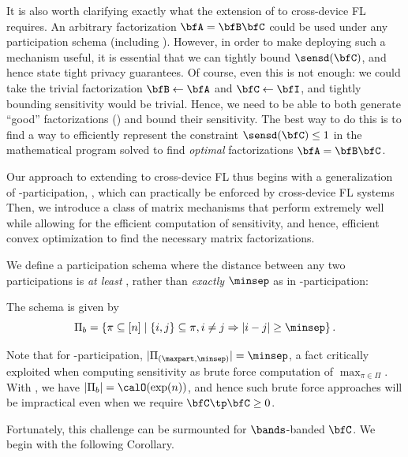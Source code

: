 It is also worth clarifying exactly what the extension of \MFFTRL to cross-device FL requires. An arbitrary factorization $\bfA = \bfB \bfC$ could be used under any participation schema (including \bparticipation). However, in order to make deploying such a mechanism useful, it is essential that we can tightly bound $\sensd(\bfC)$, and hence state tight privacy guarantees. Of course, even this is not enough: we could take the trivial factorization $\bfB \leftarrow \bfA$ and $\bfC \leftarrow \bfI$, and tightly bounding sensitivity would be trivial. Hence, we need to be able to both generate ``good'' factorizations () and bound their sensitivity. The best way to do this is to find a way to efficiently represent the constraint $\sensd(\bfC) \le 1$ in the mathematical program solved to find \emph{optimal} factorizations $\bfA = \bfB \bfC$.

Our approach to extending \MFFTRL to cross-device FL thus begins with a generalization of \multiepoch-participation, \bparticipation, which can practically be enforced by cross-device FL systems   Then, we introduce a class of matrix mechanisms that perform extremely well while allowing for the efficient computation of sensitivity, and hence, efficient convex optimization to find the necessary matrix factorizations.

We define a participation schema where the distance between any two participations is \emph{at least} \minsep, rather than \emph{exactly} $\minsep$ as in \multiepoch-participation:
\begin{definition}\label{def:bparticipation}
The \textbf{\bparticipation} schema is given by
\[
  \Pi_b = \left\{\pi \subseteq [n]  \mid \{i, j\} \subseteq \pi, i \ne j \Rightarrow |i - j| \ge \minsep\right\}.
\]
\end{definition}


Note that for \multiepoch-participation, $|\Pi_{(\maxpart,\minsep)}| = \minsep$, a fact \citet[Eq. 3]{choquette22multiepoch} critically exploited when computing sensitivity as brute force computation of $\max_{\pi \in \Pi}$.  With \bparticipation, we have $|\Pi_b| = \calO(\exp(n))$,   and hence such brute force approaches will be impractical even when we require $\bfC\tp \bfC \ge 0$.

Fortunately, this challenge can be surmounted for $\bands$-banded $\bfC$. We begin with the following Corollary.

